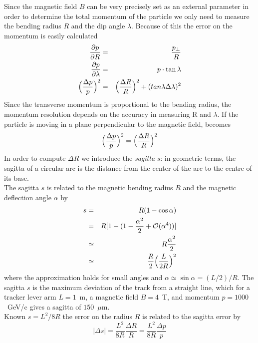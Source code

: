 Since the magnetic field $B$ can be very precisely set as an external parameter
in order to determine the total momentum of the particle we only need to measure
the bending radius $R$ and the dip angle $\lambda$.  Because of this the error
on the momentum is easily calculated
\begin{eqnarray}\label{res_p}
  \frac{\partial p}{\partial R}&=&\frac{p_{\perp}}{R}\nonumber\\
  \frac{\partial p}{\partial \lambda}&=&{p}\cdot\tan \lambda\nonumber\\
  \Bigl(\frac{\Delta p}{p} \Bigr)^2&=&\Bigl(\frac{\Delta R}{R}\Bigr)^2+(tan \lambda \Delta \lambda)^2
\end{eqnarray}
Since the transverse momentum is proportional to the bending radius, the
momentum resolution depends on the accuracy in measuring R and $\lambda$.  If
the particle is moving in a plane perpendicular to the magnetic field,
 becomes
\begin{equation}\label{dp_dR}
  \Bigl(\frac{\Delta p}{p} \Bigr)^2=\Bigl(\frac{\Delta R}{R}\Bigr)^2
\end{equation} 
In order to compute $\Delta R$ we introduce the {\it sagitta} $s$: in geometric
terms, the sagitta of a circular arc is the distance from
the center of the arc to the centre of its base.\\
The sagitta $s$ is related to the magnetic bending radius $R$ and the magnetic
deflection angle $\alpha$ by
\begin{eqnarray}
  s&=&R(1-\cos \alpha)\nonumber\\
   &=&R[1-(1-\frac{\alpha^2}{2}+\mathcal{O}(\alpha^4))]\nonumber\\
   &\simeq&R\frac{\alpha^2}{2}\nonumber\\
   &\simeq&\frac{R}{2}\Bigl(\frac{L}{2R} \Bigr)^2
\end{eqnarray}
where the approximation holds for small angles and
$\alpha\simeq \sin \alpha=(L/2)/R$.  The sagitta $s$ is the maximum deviation of
the track from a straight line, which for a tracker lever arm $L=1$~m, a
magnetic field $B=4$~T, and momentum $p=1000$~GeV/c gives a
sagitta of $150$~$\mu$m.\\
Known %
$s=L^2/8R$ the error on the radius $R$ is related to the sagitta error by
\begin{equation}
  |\Delta s|=\frac{L^2}{8R}\frac{\Delta R}{R}=\frac{L^2}{8R}\frac{\Delta p}{p}
\end{equation}
